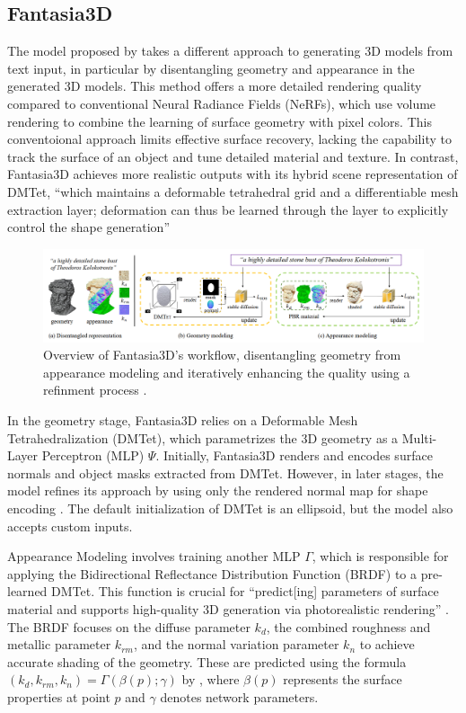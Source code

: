\subsection{Fantasia3D}\label{fantasia3D}

The model proposed by \citeauthor{chen2023fantasia3d} takes a different approach to generating 3D models from text input, in particular by disentangling geometry and appearance in the generated 3D models.
This method offers a more detailed rendering quality compared to conventional Neural Radiance Fields (NeRFs), which use volume rendering to combine the learning of surface geometry with pixel colors. This conventoional approach limits effective surface recovery, lacking the capability to track the surface of an object and tune detailed material and texture. In contrast, Fantasia3D achieves more realistic outputs with its hybrid scene representation of DMTet, ``which maintains a deformable tetrahedral grid and a differentiable mesh extraction layer; deformation can thus be learned through the layer to explicitly control the shape generation'' \citep{chen2023fantasia3d}

\begin{figure}[ht]
  \centering
    \includegraphics[width=1\columnwidth]{figures/Fantasia3D.png}
    \caption{Overview of Fantasia3D's workflow, disentangling geometry from appearance modeling and iteratively enhancing the quality using a refinment process \citep{chen2023fantasia3d}.}\label{fig:figureFantasia}
\end{figure}

In the geometry stage, Fantasia3D relies on a Deformable Mesh Tetrahedralization (DMTet), which parametrizes the 3D geometry as a Multi-Layer Perceptron (MLP) \(\Psi\). Initially, Fantasia3D renders and encodes surface normals and object masks extracted from DMTet. However, in later stages, the model refines its approach by using only the rendered normal map for shape encoding \citep{chen2023fantasia3d}. The default initialization of DMTet is an ellipsoid, but the model also accepts custom inputs.

Appearance Modeling involves training another MLP \( \Gamma \), which is responsible for applying the Bidirectional Reflectance Distribution Function (BRDF) \citep{chen2023fantasia3d} to a pre-learned DMTet. This function is crucial for ``predict[ing] parameters of surface material and supports high-quality 3D generation via photorealistic rendering'' \citep{chen2023fantasia3d}. The BRDF focuses on the diffuse parameter \(k_d\), the combined roughness and metallic parameter \(k_{rm}\), and the normal variation parameter \(k_n\) to achieve accurate shading of the geometry. These are predicted using the formula \((k_d, k_{rm}, k_n) = \Gamma(\beta(p); \gamma)\) by \citeauthor{chen2023fantasia3d}, where \(\beta(p)\) represents the surface properties at point \(p\) and \(\gamma\) denotes network parameters.

